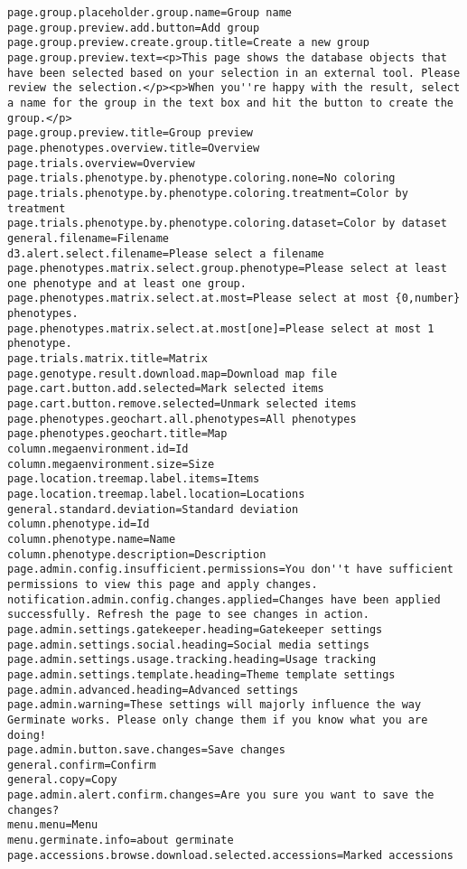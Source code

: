 \begin{itemize}
\begin{lstlisting}[style=Properties]
page.group.placeholder.group.name=Group name
page.group.preview.add.button=Add group
page.group.preview.create.group.title=Create a new group
page.group.preview.text=<p>This page shows the database objects that have been selected based on your selection in an external tool. Please review the selection.</p><p>When you''re happy with the result, select a name for the group in the text box and hit the button to create the group.</p>
page.group.preview.title=Group preview
page.phenotypes.overview.title=Overview
page.trials.overview=Overview
page.trials.phenotype.by.phenotype.coloring.none=No coloring
page.trials.phenotype.by.phenotype.coloring.treatment=Color by treatment
page.trials.phenotype.by.phenotype.coloring.dataset=Color by dataset
general.filename=Filename
d3.alert.select.filename=Please select a filename
page.phenotypes.matrix.select.group.phenotype=Please select at least one phenotype and at least one group.
page.phenotypes.matrix.select.at.most=Please select at most {0,number} phenotypes.
page.phenotypes.matrix.select.at.most[one]=Please select at most 1 phenotype.
page.trials.matrix.title=Matrix
page.genotype.result.download.map=Download map file
page.cart.button.add.selected=Mark selected items
page.cart.button.remove.selected=Unmark selected items
page.phenotypes.geochart.all.phenotypes=All phenotypes
page.phenotypes.geochart.title=Map
column.megaenvironment.id=Id
column.megaenvironment.size=Size
page.location.treemap.label.items=Items
page.location.treemap.label.location=Locations
general.standard.deviation=Standard deviation
column.phenotype.id=Id
column.phenotype.name=Name
column.phenotype.description=Description
page.admin.config.insufficient.permissions=You don''t have sufficient permissions to view this page and apply changes.
notification.admin.config.changes.applied=Changes have been applied successfully. Refresh the page to see changes in action.
page.admin.settings.gatekeeper.heading=Gatekeeper settings
page.admin.settings.social.heading=Social media settings
page.admin.settings.usage.tracking.heading=Usage tracking
page.admin.settings.template.heading=Theme template settings
page.admin.advanced.heading=Advanced settings
page.admin.warning=These settings will majorly influence the way Germinate works. Please only change them if you know what you are doing!
page.admin.button.save.changes=Save changes
general.confirm=Confirm
general.copy=Copy
page.admin.alert.confirm.changes=Are you sure you want to save the changes?
menu.menu=Menu
menu.germinate.info=about germinate
page.accessions.browse.download.selected.accessions=Marked accessions

\end{lstlisting}
\end{itemize}
